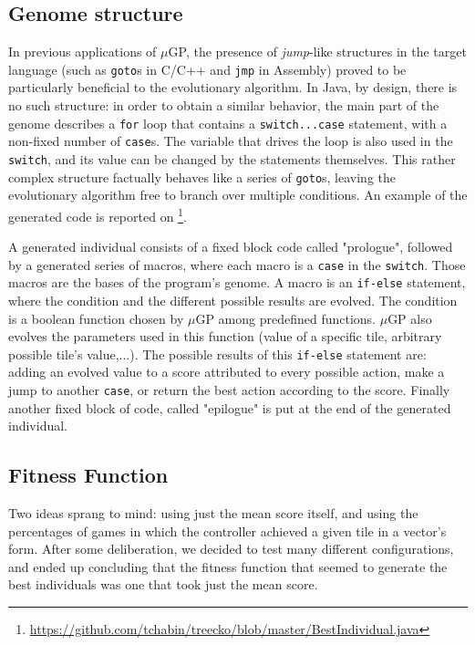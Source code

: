\documentclass[11pt,twocolumn]{article}
\begin{document}
\subsection{Genome structure}

In previous applications of $\mu$GP, the presence of \emph{jump}-like structures in the target language (such as \texttt{goto}s in C/C++ and \texttt{jmp} in Assembly) proved to be particularly beneficial to the evolutionary algorithm. In Java, by design, there is no such structure: in order to obtain a similar behavior, the main part of the genome describes a \texttt{for} loop that contains a \texttt{switch...case} statement, with a non-fixed number of \texttt{case}s. The variable that drives the loop is also used in the \texttt{switch}, and its value can be changed by the statements themselves. This rather complex structure factually behaves like a series of \texttt{goto}s, leaving the evolutionary algorithm free to branch over multiple conditions. An example of the generated code is reported on \footnote{\url{https://github.com/tchabin/treecko/blob/master/BestIndividual.java}}.



A generated individual consists of a fixed block code  called "prologue", followed by a generated series of macros, where each macro is a \texttt{case} in the \texttt{switch}. Those macros are the bases of the program's genome. A macro is an \texttt{if-else} statement, where the condition and the different possible results are evolved. The condition is a boolean function chosen by $\mu$GP among predefined functions. $\mu$GP also evolves the parameters used in this function (value of a specific tile, arbitrary possible tile's value,...). The possible results of this \texttt{if-else} statement are: adding an evolved value to a score attributed to every possible action, make a jump to another \texttt{case}, or return the best action according to the score.
Finally another fixed block of code, called "epilogue" is put at the end of the generated individual.



\subsection{Fitness Function}
Two ideas sprang to mind: using just the mean score itself, and using the percentages of games in which the controller achieved a given tile in a vector's form. After some deliberation, we decided to test many different configurations, and ended up concluding that the fitness function that seemed to generate the best individuals was one that took just the mean score.
\end{document}
